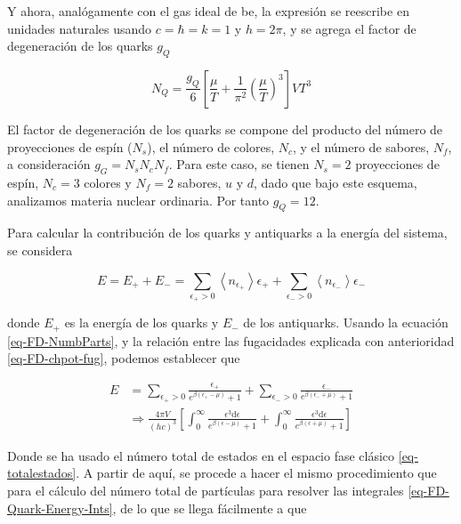 Y ahora, analógamente con el gas ideal de \acrshort{be}, la expresión se reescribe en unidades naturales usando $c=\hbar = k = 1$ y $h = 2\pi$, y se agrega el factor de degeneración de los quarks ${g}_{Q}$

\begin{equation}\label{eq-FD-Total-Number-Particles-Quarks}
{N}_{Q} = \frac{{g}_{Q}}{6} \left[\frac{\mu}{T} + \frac{1}{{\pi}^{2}} \left(\frac{\mu}{T} \right)^{3} \right] V{T}^{3}
\end{equation}

El factor de degeneración de los quarks se compone del producto del número de proyecciones de espín (${N}_{s}$), el número de colores, ${N}_{c}$, y el número de sabores, ${N}_{f}$, a consideración ${g}_{G}={N}_{s}{N}_{c}{N}_{f}$. Para este caso, se tienen ${N}_{s}=2$ proyecciones de espín, ${N}_{c}=3$ colores y ${N}_{f}=2$ sabores, $u$ y $d$, dado que bajo este esquema, analizamos materia nuclear ordinaria. Por tanto ${g}_{Q}=12$.

Para calcular la contribución de los quarks y antiquarks a la energía del sistema, se considera

\begin{equation}
E = {E}_{+} + {E}_{-} = \sum_{{\epsilon}_{+}>0} \left\langle{n}_{{\epsilon}_{+}} \right\rangle {\epsilon}_{+} + \sum_{{\epsilon}_{-}>0} \left\langle{n}_{{\epsilon}_{-}} \right\rangle {\epsilon}_{-} 
\end{equation}

donde ${E}_{+}$ es la energía de los quarks y ${E}_{-}$ de los antiquarks. Usando la ecuación \eqref{eq-FD-NumbParts}, y la relación entre las fugacidades explicada con anterioridad \eqref{eq-FD-chpot-fug}, podemos establecer que 

\begin{equation}\label{eq-FD-Quark-Energy-Ints}
\begin{split}
E & = \sum_{{\epsilon}_{+} > 0} \frac{{\epsilon}_{+}}{{e}^{\beta({\epsilon}_{+}-\mu)} + 1} + \sum_{{\epsilon}_{-} > 0} \frac{{\epsilon}_{-}}{{e}^{\beta({\epsilon}_{-}+\mu)} + 1} \\
& \Rightarrow \frac{4{\pi}V}{(hc)^{3}} \left[ \int_{0}^{\infty}  \frac{{\epsilon}^{3} \mathrm{d} \epsilon}{{e}^{\beta({\epsilon}-\mu)} + 1}+ \int_{0}^{\infty}\frac{{\epsilon}^{3} \mathrm{d} \epsilon}{{e}^{\beta({\epsilon}+\mu)} + 1} \right]
\end{split}
\end{equation}

Donde se ha usado el número total de estados en el espacio fase clásico \eqref{eq-totalestados}. A partir de aquí, se procede a hacer el mismo procedimiento que para el cálculo del número total de partículas para resolver las integrales \eqref{eq-FD-Quark-Energy-Ints}, de lo que se llega fácilmente a que 

